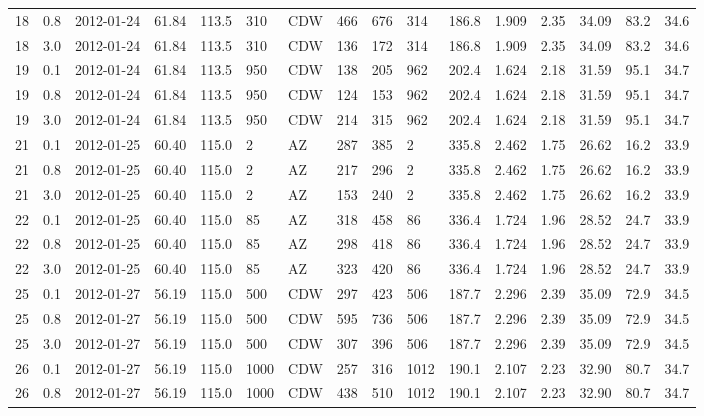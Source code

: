 {\begin{landscape}
\begin{longtable}{llllllllllllllll}
18 & 0.8 & 2012-01-24 & \textminus{}61.84 & 113.5 & 310 & CDW & 466 & 676 & 314 & 186.8 & 1.909 & 2.35 & 34.09 & 83.2 & 34.6\\
18 & 3.0 & 2012-01-24 & \textminus{}61.84 & 113.5 & 310 & CDW & 136 & 172 & 314 & 186.8 & 1.909 & 2.35 & 34.09 & 83.2 & 34.6\\
19 & 0.1 & 2012-01-24 & \textminus{}61.84 & 113.5 & 950 & CDW & 138 & 205 & 962 & 202.4 & 1.624 & 2.18 & 31.59 & 95.1 & 34.7\\
19 & 0.8 & 2012-01-24 & \textminus{}61.84 & 113.5 & 950 & CDW & 124 & 153 & 962 & 202.4 & 1.624 & 2.18 & 31.59 & 95.1 & 34.7\\
19 & 3.0 & 2012-01-24 & \textminus{}61.84 & 113.5 & 950 & CDW & 214 & 315 & 962 & 202.4 & 1.624 & 2.18 & 31.59 & 95.1 & 34.7\\
21 & 0.1 & 2012-01-25 & \textminus{}60.40 & 115.0 & 2 & AZ & 287 & 385 & 2 & 335.8 & 2.462 & 1.75 & 26.62 & 16.2 & 33.9\\
21 & 0.8 & 2012-01-25 & \textminus{}60.40 & 115.0 & 2 & AZ & 217 & 296 & 2 & 335.8 & 2.462 & 1.75 & 26.62 & 16.2 & 33.9\\
21 & 3.0 & 2012-01-25 & \textminus{}60.40 & 115.0 & 2 & AZ & 153 & 240 & 2 & 335.8 & 2.462 & 1.75 & 26.62 & 16.2 & 33.9\\
22 & 0.1 & 2012-01-25 & \textminus{}60.40 & 115.0 & 85 & AZ & 318 & 458 & 86 & 336.4 & 1.724 & 1.96 & 28.52 & 24.7 & 33.9\\
22 & 0.8 & 2012-01-25 & \textminus{}60.40 & 115.0 & 85 & AZ & 298 & 418 & 86 & 336.4 & 1.724 & 1.96 & 28.52 & 24.7 & 33.9\\
22 & 3.0 & 2012-01-25 & \textminus{}60.40 & 115.0 & 85 & AZ & 323 & 420 & 86 & 336.4 & 1.724 & 1.96 & 28.52 & 24.7 & 33.9\\
25 & 0.1 & 2012-01-27 & \textminus{}56.19 & 115.0 & 500 & CDW & 297 & 423 & 506 & 187.7 & 2.296 & 2.39 & 35.09 & 72.9 & 34.5\\
25 & 0.8 & 2012-01-27 & \textminus{}56.19 & 115.0 & 500 & CDW & 595 & 736 & 506 & 187.7 & 2.296 & 2.39 & 35.09 & 72.9 & 34.5\\
25 & 3.0 & 2012-01-27 & \textminus{}56.19 & 115.0 & 500 & CDW & 307 & 396 & 506 & 187.7 & 2.296 & 2.39 & 35.09 & 72.9 & 34.5\\
26 & 0.1 & 2012-01-27 & \textminus{}56.19 & 115.0 & 1000 & CDW & 257 & 316 & 1012 & 190.1 & 2.107 & 2.23 & 32.90 & 80.7 & 34.7\\
26 & 0.8 & 2012-01-27 & \textminus{}56.19 & 115.0 & 1000 & CDW & 438 & 510 & 1012 & 190.1 & 2.107 & 2.23 & 32.90 & 80.7 & 34.7\\

\end{longtable}
\end{landscape}}
